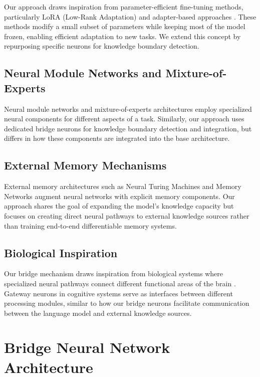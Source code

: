\documentclass[9pt,a4paper,twocolumn,twoside]{tau-class/tau}
\begin{document}
    Our approach draws inspiration from parameter-efficient fine-tuning methods, particularly LoRA (Low-Rank Adaptation) \cite{hu2021lora} and adapter-based approaches \cite{houlsby2019parameter}. These methods modify a small subset of parameters while keeping most of the model frozen, enabling efficient adaptation to new tasks. We extend this concept by repurposing specific neurons for knowledge boundary detection.

\subsection{Neural Module Networks and Mixture-of-Experts}

    Neural module networks \cite{andreas2016neural} and mixture-of-experts architectures \cite{shazeer2017outrageously} employ specialized neural components for different aspects of a task. Similarly, our approach uses dedicated bridge neurons for knowledge boundary detection and integration, but differs in how these components are integrated into the base architecture.

\subsection{External Memory Mechanisms}

    External memory architectures such as Neural Turing Machines \cite{graves2014neural} and Memory Networks \cite{weston2014memory} augment neural networks with explicit memory components. Our approach shares the goal of expanding the model's knowledge capacity but focuses on creating direct neural pathways to external knowledge sources rather than training end-to-end differentiable memory systems.

\subsection{Biological Inspiration}

    Our bridge mechanism draws inspiration from biological systems where specialized neural pathways connect different functional areas of the brain \cite{sporns2016modular}. Gateway neurons in cognitive systems serve as interfaces between different processing modules, similar to how our bridge neurons facilitate communication between the language model and external knowledge sources.

\section{Bridge Neural Network Architecture}
\end{document}
